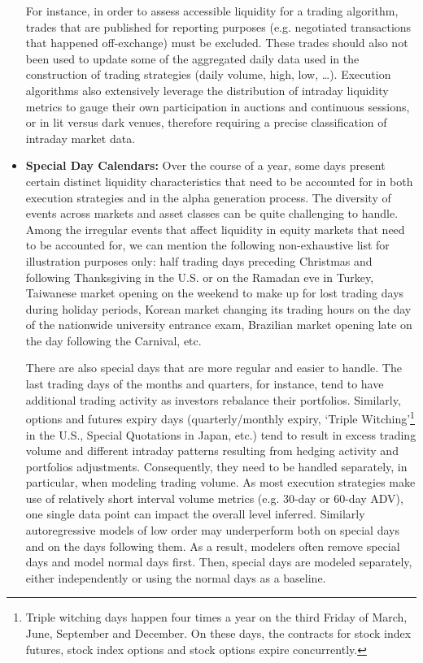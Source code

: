 \begin{itemize}
For instance, in order to assess accessible liquidity for a trading algorithm, trades that are published for reporting purposes (e.g. negotiated transactions that happened off-exchange) must be excluded. These trades should also not been used to update some of the aggregated daily data used in the construction of trading strategies (daily volume, high, low, \dots). Execution algorithms also extensively leverage the distribution of intraday liquidity metrics to gauge their own participation in auctions and continuous sessions, or in lit versus dark venues, therefore requiring a precise classification of intraday market data. 


\item \textbf{Special Day Calendars:} Over the course of a year, some days present certain distinct liquidity characteristics that need to be accounted for in both execution strategies and in the alpha generation process. The diversity of events across markets and asset classes can be quite challenging to handle. Among the irregular events that affect liquidity in equity markets that need to be accounted for, we can mention the following non-exhaustive list for illustration purposes only: half trading days preceding Christmas and following Thanksgiving in the U.S. or on the Ramadan eve in Turkey, Taiwanese market opening on the weekend to make up for lost trading days during holiday periods, Korean market changing its trading hours on the day of the nationwide university entrance exam, Brazilian market opening late on the day following the Carnival, etc.


There are also special days that are more regular and easier to handle. The last trading days of the months and quarters, for instance, tend to have additional trading activity as investors rebalance their portfolios. Similarly, options and futures expiry days (quarterly/monthly expiry, `Triple Witching'\footnote{Triple witching days happen four times a year on the third Friday of March, June, September and December. On these days, the contracts for stock index futures, stock index options and stock options expire concurrently.} in the U.S., Special Quotations in Japan, etc.) tend to result in excess trading volume and different intraday patterns resulting from hedging activity and portfolios adjustments. Consequently, they need to be handled separately, in particular, when modeling trading volume. As most execution strategies make use of relatively short interval volume metrics (e.g. 30-day or 60-day ADV), one single data point can impact the overall level inferred. Similarly autoregressive models of low order may underperform both on special days and on the days following them. As a result, modelers often remove special days and model normal days first. Then, special days are modeled separately, either independently or using the normal days as a baseline. 



\end{itemize}
